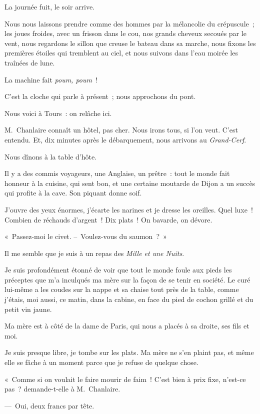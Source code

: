 \documentclass[french,twoside]{book} %
\begin{document}
La journée fuit, le soir arrive.\par
\bigbreak
\noindent Nous nous laissons prendre comme des hommes par la mélancolie du crépuscule ; les joues froides, avec un frisson dans le cou, nos grands cheveux secoués par le vent, nous regardons le sillon que creuse le bateau dans sa marche, nous fixons les premières étoiles qui tremblent au ciel, et nous suivons dans l’eau moirée les traînées de lune.\par
La machine fait \emph{poum, poum} !\par
\bigbreak
\noindent C’est la cloche qui parle à présent ; nous approchons du pont.\par
Nous voici à Tours : on relâche ici.\par
M. Chanlaire connaît un hôtel, pas cher. Nous irons tous, si l’on veut. C’est entendu. Et, dix minutes après le débarquement, nous arrivons au \emph{Grand-Cerf}.\par
\bigbreak
\noindent Nous dînons à la table d’hôte.\par
Il y a des commis voyageurs, une Anglaise, un prêtre : tout le monde fait honneur à la cuisine, qui sent bon, et une certaine moutarde de Dijon a un succès qui profite à la cave. Son piquant donne soif.\par
J’ouvre des yeux énormes, j’écarte les narines et je dresse les oreilles. Quel luxe ! Combien de réchauds d’argent ! Dix plats ! On bavarde, on dévore.\par
« Passez-moi le civet. – Voulez-vous du saumon ? »\par
Il me semble que je suis à un repas des \emph{Mille et une Nuits}.\par
Je suis profondément étonné de voir que tout le monde foule aux pieds les préceptes que m’a inculqués ma mère sur la façon de se tenir en société. Le curé lui-même a les coudes sur la nappe et sa chaise tout près de la table, comme j’étais, moi aussi, ce matin, dans la cabine, en face du pied de cochon grillé et du petit vin jaune.\par
Ma mère est à côté de la dame de Paris, qui nous a placés à sa droite, ses fils et moi.\par
Je suis presque libre, je tombe sur les plats. Ma mère ne s’en plaint pas, et même elle se fâche à un moment parce que je refuse de quelque chose.\par
« Comme si on voulait le faire mourir de faim ! C’est bien à prix fixe, n’est-ce pas ? demande-t-elle à M. Chanlaire.\par
— Oui, deux francs par tête.\par
\end{document}
